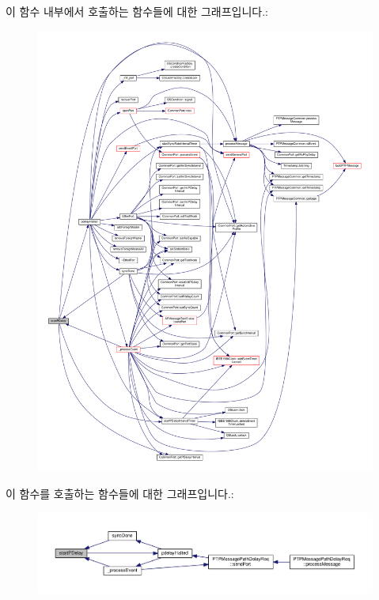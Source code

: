 이 함수 내부에서 호출하는 함수들에 대한 그래프입니다.\+:
\nopagebreak
\begin{figure}[H]
\begin{center}
\leavevmode
\includegraphics[width=350pt]{class_ether_port_ab099720a7511dbef4546f70e5e3b1075_cgraph}
\end{center}
\end{figure}




이 함수를 호출하는 함수들에 대한 그래프입니다.\+:
\nopagebreak
\begin{figure}[H]
\begin{center}
\leavevmode
\includegraphics[width=350pt]{class_ether_port_ab099720a7511dbef4546f70e5e3b1075_icgraph}
\end{center}
\end{figure}


